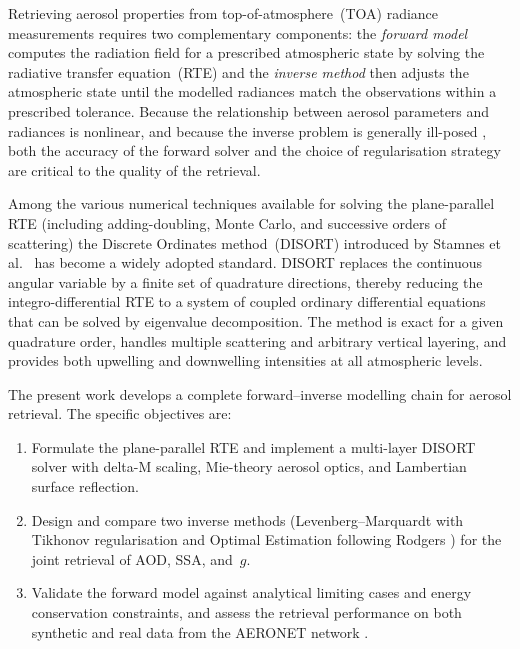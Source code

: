 \documentclass[a4paper, 11pt]{article}
\begin{document}
Retrieving aerosol properties from top-of-atmosphere~(TOA) radiance
measurements requires two complementary components: the \emph{forward model} computes the radiation field for a prescribed atmospheric state by solving the radiative transfer equation~(RTE) and the \emph{inverse method} then adjusts the atmospheric state until the
modelled radiances match the observations within a prescribed
tolerance.  Because the relationship between aerosol parameters and
radiances is nonlinear, and because the inverse problem is generally
ill-posed \cite{hadamard1902,tikhonov1977}, both the accuracy of the
forward solver and the choice of regularisation strategy are critical
to the quality of the retrieval.

Among the various numerical techniques available for solving the
plane-parallel RTE (including adding-doubling, Monte Carlo, and
successive orders of scattering) the Discrete Ordinates
method~(DISORT) introduced by Stamnes et al.\ \cite{stamnes1988} has become a
widely adopted standard.  DISORT replaces the continuous angular
variable by a finite set of quadrature directions, thereby reducing
the integro-differential RTE to a system of coupled ordinary
differential equations that can be solved by eigenvalue decomposition.
The method is exact for a given quadrature order, handles multiple
scattering and arbitrary vertical layering, and provides both upwelling
and downwelling intensities at all atmospheric levels.

The present work develops a complete forward--inverse modelling chain
for aerosol retrieval.  The specific objectives are:
\begin{enumerate}
  \item Formulate the plane-parallel RTE and implement a multi-layer
        DISORT solver with delta-M scaling, Mie-theory aerosol
        optics, and Lambertian surface reflection.
  \item Design and compare two inverse methods (Levenberg--Marquardt
        with Tikhonov regularisation and Optimal Estimation following
        Rodgers \cite{rodgers2000}) for the joint
        retrieval of AOD, SSA, and~$g$.
  \item Validate the forward model against analytical limiting cases
        and energy conservation constraints, and assess the retrieval
        performance on both synthetic and real data from the AERONET
        network \cite{holben1998}.
\end{enumerate}
\end{document}
